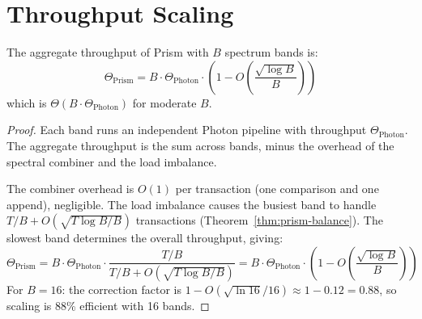 \section{Throughput Scaling}

\label{sec:prism-throughput}

\begin{theorem}
\label{thm:prism-scaling}
The aggregate throughput of Prism with $B$ spectrum bands is:
\[
\Theta_{\text{Prism}} = B \cdot \Theta_{\text{Photon}} \cdot \left(1 - O\left(\frac{\sqrt{\log B}}{B}\right)\right)
\]
which is $\Theta(B \cdot \Theta_{\text{Photon}})$ for moderate $B$.
\end{theorem}

\begin{proof}
Each band runs an independent Photon pipeline with throughput $\Theta_{\text{Photon}}$.
The aggregate throughput is the sum across bands, minus the overhead of the spectral
combiner and the load imbalance.

The combiner overhead is $O(1)$ per transaction (one comparison and one append), negligible.
The load imbalance causes the busiest band to handle $T/B + O(\sqrt{T\log B / B})$
transactions (Theorem~\ref{thm:prism-balance}). The slowest band determines the overall
throughput, giving:
\[
\Theta_{\text{Prism}} = B \cdot \Theta_{\text{Photon}} \cdot \frac{T/B}{T/B + O(\sqrt{T\log B/B})}
= B \cdot \Theta_{\text{Photon}} \cdot \left(1 - O\left(\frac{\sqrt{\log B}}{B}\right)\right)
\]
For $B = 16$: the correction factor is $1 - O(\sqrt{\ln 16}/16) \approx 1 - 0.12 = 0.88$,
so scaling is 88\% efficient with 16 bands.
\end{proof}

